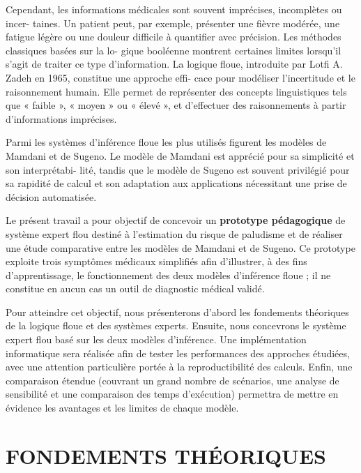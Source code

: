 \documentclass[a4paper,12pt]{report} %
\begin{document}
Cependant, les informations médicales sont souvent imprécises, incomplètes ou incer-
taines. Un patient peut, par exemple, présenter une fièvre modérée, une fatigue légère ou
une douleur difficile à quantifier avec précision. Les méthodes classiques basées sur la lo-
gique booléenne montrent certaines limites lorsqu'il s'agit de traiter ce type d'information.
La logique floue, introduite par Lotfi A. Zadeh en 1965, constitue une approche effi-
cace pour modéliser l'incertitude et le raisonnement humain. Elle permet de représenter
des concepts linguistiques tels que « faible », « moyen » ou « élevé », et d'effectuer des
raisonnements à partir d'informations imprécises.

Parmi les systèmes d'inférence floue les plus utilisés figurent les modèles de Mamdani
et de Sugeno. Le modèle de Mamdani est apprécié pour sa simplicité et son interprétabi-
lité, tandis que le modèle de Sugeno est souvent privilégié pour sa rapidité de calcul et
son adaptation aux applications nécessitant une prise de décision automatisée.

Le présent travail a pour objectif de concevoir un \textbf{prototype pédagogique} de système
expert flou destiné à l'estimation du risque de paludisme et de réaliser une étude comparative
entre les modèles de Mamdani et de Sugeno. Ce prototype exploite trois symptômes médicaux
simplifiés afin d'illustrer, à des fins d'apprentissage, le fonctionnement des deux modèles
d'inférence floue ; il ne constitue en aucun cas un outil de diagnostic médical validé.

Pour atteindre cet objectif, nous présenterons d'abord les fondements théoriques de la
logique floue et des systèmes experts. Ensuite, nous concevrons le système expert flou basé
sur les deux modèles d'inférence. Une implémentation informatique sera réalisée
afin de tester les performances des approches étudiées, avec une attention particulière portée
à la reproductibilité des calculs. Enfin, une comparaison étendue (couvrant un grand nombre
de scénarios, une analyse de sensibilité et une comparaison des temps d'exécution) permettra
de mettre en évidence les avantages et les limites de chaque modèle.


\newpage
\chapter{FONDEMENTS THÉORIQUES}
\end{document}
